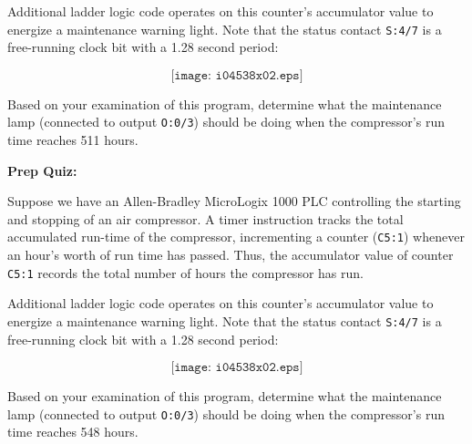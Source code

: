 Additional ladder logic code operates on this counter's accumulator value to energize a maintenance warning light.  Note that the status contact {\tt S:4/7} is a free-running clock bit with a 1.28 second period:

$$\texttt{[image: i04538x02.eps]}$$

Based on your examination of this program, determine what the maintenance lamp (connected to output {\tt O:0/3}) should be doing when the compressor's run time reaches 511 hours.


\vfil \eject

\noindent
{\bf Prep Quiz:}

Suppose we have an Allen-Bradley MicroLogix 1000 PLC controlling the starting and stopping of an air compressor.  A timer instruction tracks the total accumulated run-time of the compressor, incrementing a counter ({\tt C5:1}) whenever an hour's worth of run time has passed.  Thus, the accumulator value of counter {\tt C5:1} records the total number of hours the compressor has run.

Additional ladder logic code operates on this counter's accumulator value to energize a maintenance warning light.  Note that the status contact {\tt S:4/7} is a free-running clock bit with a 1.28 second period:

$$\texttt{[image: i04538x02.eps]}$$

Based on your examination of this program, determine what the maintenance lamp (connected to output {\tt O:0/3}) should be doing when the compressor's run time reaches 548 hours.





